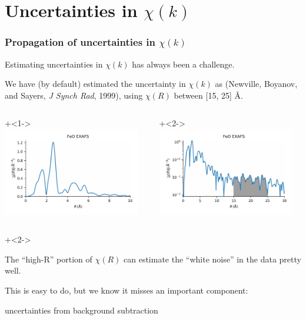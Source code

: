 

\section{Uncertainties in $\chi(k)$}
\begin{frame}\frametitle{Propagation of uncertainties in $\chi(k)$}

\begin{cenpage}{135mm}

  Estimating uncertainties in  $\chi(k)$ has always been a challenge.

  \vmm

  We have (by default) estimated the uncertainty in $\chi(k)$ as
  {} {\tiny{(Newville, Boyanov, and Sayers, {\emph{J
          Synch Rad}}, 1999)}}, using $\chi(R)$ between [15, 25] \AA.

\begin{columns}
  \begin{column}[T]{60mm}

    {\onslide+<1->  \includegraphics[width=60mm]{figs/errors/feo_chir}  }


  \end{column}
  \begin{column}[T]{60mm}

    {\onslide+<2-> \includegraphics[width=60mm]{figs/errors/feo_chir_logscale} }

  \end{column}
\end{columns}

{\onslide+<2->

  \begin{cenpage}{105mm}


    The ``high-R'' portion of $\chi(R)$ can estimate the
    ``white noise'' in the data pretty well.

    \vmm
    This is easy to do, but we know it misses an important component:
  \end{cenpage}


  \begin{postitbox}{63mm}
      {uncertainties from  background subtraction}
  \end{postitbox}

}
\end{cenpage}

\end{frame}


